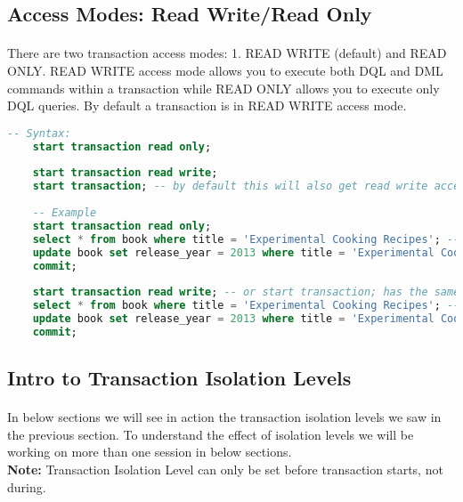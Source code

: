 \subsection{Access Modes: Read Write/Read Only}
\paragraph{} There are two transaction access modes: 1. READ WRITE (default) and READ ONLY. READ WRITE access mode allows you to execute both \acs{DQL} and \acs{DML} commands within a transaction while READ ONLY allows you to execute only \acs{DQL} queries. By default a transaction is in READ WRITE access mode.
\begin{lstlisting}[language=SQL]
	-- Syntax:
	start transaction read only;
	
	start transaction read write;
	start transaction; -- by default this will also get read write access mode
	
	-- Example
	start transaction read only;
	select * from book where title = 'Experimental Cooking Recipes'; -- book will be there with updated release year
	update book set release_year = 2013 where title = 'Experimental Cooking Recipes'; -- this or any other DML command (insert/update/delete) will fail
	commit;
	
	start transaction read write; -- or start transaction; has the same access mode
	select * from book where title = 'Experimental Cooking Recipes'; -- book will be there with updated release year
	update book set release_year = 2013 where title = 'Experimental Cooking Recipes'; -- now both commands will work
	commit;
\end{lstlisting}
\subsection{Intro to Transaction Isolation Levels}
\paragraph{} In below sections we will see in action the transaction isolation levels we saw in the previous section. To understand the effect of isolation levels we will be working on more than one session in below sections.\\\textbf{Note:} Transaction Isolation Level can only be set before transaction starts, not during.
